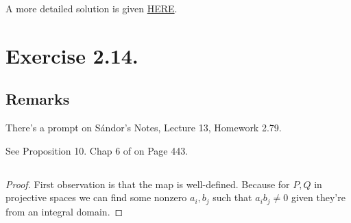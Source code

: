 A more detailed solution is given \href{http://therisingsea.org/notes/hartshorne1-2.pdf}{HERE}.

\section{Exercise 2.14.}

\subsection{Remarks}
There's a prompt on S\'andor's Notes, Lecture 13, Homework 2.79. 

See Proposition 10. Chap 6 of \cite{cox2013ideals} on Page 443.

\subsection{}

\begin{proof}
First observation is that the map is well-defined. Because for $P,Q$ in projective spaces we can find some nonzero $a_i,b_j$ such that $a_ib_j\neq 0$ given they're from an integral domain. 

\end{proof}